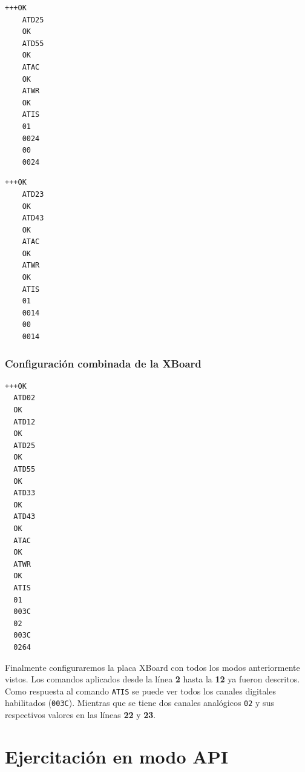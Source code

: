 \documentclass[11pt,oneside,spanish,a4paper]{article}
\begin{document}
\noindent\begin{minipage}{.45\textwidth}
\begin{lstlisting}[emph={+++,ATIS,ATD25,ATD55,ATWR,ATAC},
    emphstyle={\color{blue}}, caption={Dos salidas
      en alto.}, label=code:2do]
    +++OK
    ATD25
    OK
    ATD55
    OK
    ATAC
    OK
    ATWR
    OK
    ATIS
    01
    0024
    00
    0024
\end{lstlisting}  
\end{minipage}\hfill
\begin{minipage}{.45\textwidth}
\begin{lstlisting}[emph={+++,ATIS,ATD23,ATD43,ATWR,ATAC},
    emphstyle={\color{blue}}, caption={Dos entradas},
 label=code:2di]
    +++OK
    ATD23
    OK
    ATD43
    OK
    ATAC
    OK  
    ATWR
    OK
    ATIS
    01
    0014
    00
    0014
\end{lstlisting}  
\end{minipage}

\subsubsection{Configuración combinada de la XBoard}

\noindent\begin{minipage}{.35\textwidth}
\begin{lstlisting}[emph={+++,ATIS,ATD02,ATD12,ATD25,ATD55,ATD33,ATD43,ATWR,ATAC},
emphstyle={\color{blue}}, caption={GPIO de la placa XBoard.},label=code:completo]
  +++OK
  ATD02
  OK
  ATD12
  OK
  ATD25
  OK
  ATD55
  OK
  ATD33
  OK
  ATD43
  OK
  ATAC
  OK
  ATWR
  OK
  ATIS
  01
  003C
  02
  003C
  0264
\end{lstlisting}  
\end{minipage}\hfill
\begin{minipage}{.60\textwidth}
Finalmente configuraremos la placa XBoard con todos los modos
anteriormente vistos. Los comandos aplicados desde la línea \textbf{2}
hasta la \textbf{12} ya fueron descritos. Como respuesta al comando
\texttt{ATIS} se puede ver todos los canales digitales habilitados
(\texttt{003C}). Mientras que se tiene dos canales analógicos
\texttt{02} y sus respectivos valores en las líneas \textbf{22} y
\textbf{23}.
\end{minipage}
\section{Ejercitación en modo API}
\label{sec:API}
\end{document}
